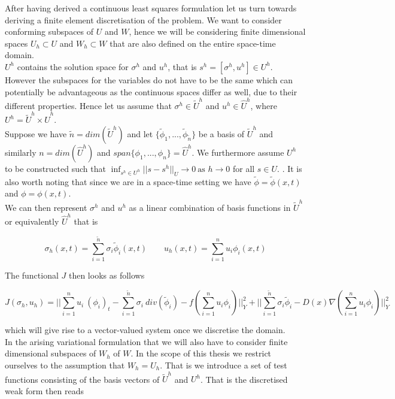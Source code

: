 \documentclass[../draft_1.tex]{subfiles}
\begin{document}
After having derived a continuous least squares formulation let us turn towards deriving a finite element discretisation of the problem. We want to consider conforming subspaces of $U$ and $W$, hence we will be considering finite dimensional spaces $U_h \subset U$ and $W_h \subset W$ that are also defined on the entire space-time domain. 
\smallskip
\\
$U^h$ contains the solution space for $\sigma^h$ and $u^h$, that is $s^h = [\sigma^h, u^h] \in U^h$. However the subspaces for the variables do not have to be the same which can potentially be advantageous as the continuous spaces differ as well, due to their different properties. Hence let us assume that $\sigma^h \in \tilde{U}^h$ and $u^h \in \hat{U}^h$, where $ U^h = \tilde{U}^h \times \hat{U}^h$. 
\smallskip
\\ 
Suppose we have $\tilde{n} = dim(\tilde{U}^h)$ and let $ \{\tilde{\phi}_1, ..., \tilde{\phi}_{\tilde{n}}\} $ be a basis of $\tilde{U}^h$ and similarly $n = dim(\hat{U}^h)$ and $span \{\phi_1, ..., \phi_n\}  = \hat{U}^h$. We furthermore assume $U^h$ to be constructed such that $\inf_{s^h \in U^h} || s - s^h||_U \rightarrow 0 \ \text{as } h \rightarrow 0$ for all $s \in U$. . It is also worth noting that since we are in a space-time setting we have $\tilde{\phi} = \tilde{\phi}(x,t)$ and  $\phi = \phi(x,t)$.
\smallskip
\\ 
We can then represent $\sigma^h$ and $u^h$ as a linear combination of basis functions in $\tilde{U}^h$ or equivalently $\hat{U}^h$ that is
\begin{ceqn}
	\begin{equation}
 	\sigma_h(x,t) = \sum_{i = 1}^{\tilde{n}} \sigma_i \tilde{\phi}_i(x,t) \qquad 
	u_h(x,t) = \sum_{i = 1}^{n} u_i \phi_i(x,t) 
	\end{equation}
\end{ceqn}
The functional $J$ then looks as follows 
\begin{ceqn}
	\begin{equation}
J(\sigma_h, u_h) =|| \sum_{i=1}^{n} u_i \ (\phi_i)_t - \sum_{i=1}^{\tilde{n}} \sigma_i \ div(\tilde{\phi}_i) - f(\sum_{i=1}^{n} u_i \phi_i) ||_Y^2 + || \sum_{i=1}^{\tilde{n}} \sigma_i \tilde{\phi}_i - D(x) \nabla (\sum_{i=1}^{n} u_i \phi_i) || _Y^2
	\end{equation}
\end{ceqn}
which will give rise to a vector-valued system once we discretise the domain. 
\smallskip
\\ 
In the arising variational formulation that we will also have to consider finite dimensional subspaces of $W_h$ of $W$. In the scope of this thesis we restrict ourselves to the assumption that $W_h = U_h$. That is we introduce a set of test functions consisting of the basis vectors of $\tilde{U}^h$ and $U^h$. That is the discretised weak form then reads 
\end{document}
